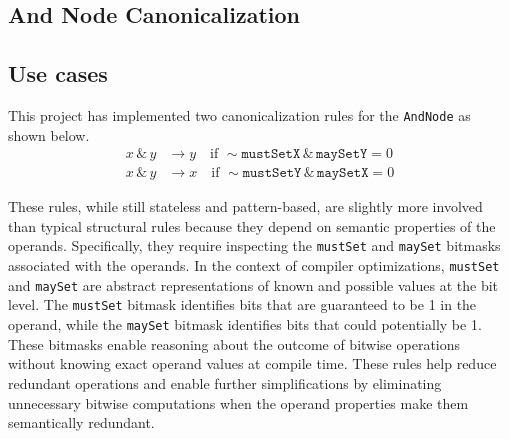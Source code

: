 \lstset{
    aboveskip=0pt,
    belowskip=0pt
}
\subsection{And Node Canonicalization}
\subsection*{Use cases}
This project has implemented two canonicalization rules for the \texttt{AndNode} as shown below.
\begin{align*}
    x \,\&\, y &\rightarrow y \quad \text{if } \sim \texttt{mustSetX} \,\&\, \texttt{maySetY} = 0 \\
    x \,\&\, y &\rightarrow x \quad \text{if } \sim \texttt{mustSetY} \,\&\, \texttt{maySetX} = 0
\end{align*}

These rules, while still stateless and pattern-based, are slightly more involved than typical structural rules because they depend on semantic properties of the operands. Specifically, they require inspecting the \texttt{mustSet} and \texttt{maySet} bitmasks associated with the operands. In the context of compiler optimizations, \texttt{mustSet} and \texttt{maySet} are abstract representations of known and possible values at the bit level. The \texttt{mustSet} bitmask identifies bits that are guaranteed to be 1 in the operand, while the \texttt{maySet} bitmask identifies bits that could potentially be 1. These bitmasks enable reasoning about the outcome of bitwise operations without knowing exact operand values at compile time.
These rules help reduce redundant operations and enable further simplifications by eliminating unnecessary bitwise computations when the operand properties make them semantically redundant.


